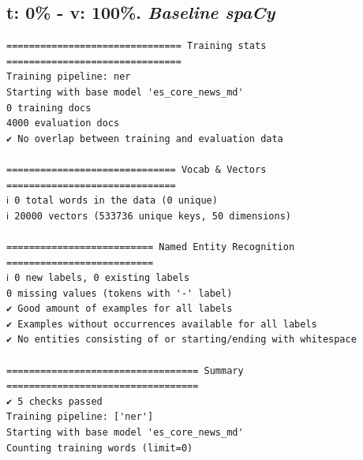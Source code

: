 \documentclass[12pt,a4paper,]{scrartcl}
\begin{document}
\hypertarget{t-0---v-100.-baseline-spacy}{%
\subsection{\texorpdfstring{t: 0\% - v: 100\%. \emph{Baseline spaCy}}{t: 0\% - v: 100\%. Baseline spaCy}}\label{t-0---v-100.-baseline-spacy}}

\begin{verbatim}
=============================== Training stats ===============================
Training pipeline: ner
Starting with base model 'es_core_news_md'
0 training docs
4000 evaluation docs
✔ No overlap between training and evaluation data

============================== Vocab & Vectors ==============================
ℹ 0 total words in the data (0 unique)
ℹ 20000 vectors (533736 unique keys, 50 dimensions)

========================== Named Entity Recognition ==========================
ℹ 0 new labels, 0 existing labels
0 missing values (tokens with '-' label)
✔ Good amount of examples for all labels
✔ Examples without occurrences available for all labels
✔ No entities consisting of or starting/ending with whitespace

================================== Summary ==================================
✔ 5 checks passed
Training pipeline: ['ner']
Starting with base model 'es_core_news_md'
Counting training words (limit=0)
\end{verbatim}
\end{document}
